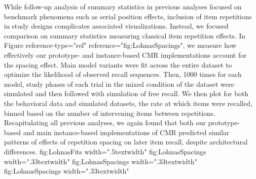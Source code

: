 {}While follow-up analysis of summary statistics in previous analyses focused on benchmark phenomena such as serial position effects, inclusion of item repetitions in study designs complicates associated visualizations. Instead, we focused comparison on summary statistics measuring classical item repetition effects. In Figure \markdownRendererLeftBrace{}reference-type="ref" reference="fig:LohnasSpacings"\markdownRendererRightBrace{}, we measure how effectively our prototype- and instance-based CMR implementations account for the spacing effect. Main model variants were fit across the entire dataset to optimize the likelihood of observed recall sequences. Then, 1000 times for each model, study phases of each trial in the mixed condition of the dataset were simulated and then followed with simulation of free recall. We then plot for both the behavioral data and simulated datasets, the rate at which items were recalled, binned based on the number of intervening items between repetitions. Recapitulating all previous analyses, we again found that both our prototype-based and main instance-based implementations of CMR predicted similar patterns of effects of repetition spacing on later item recall, despite architectural differences.\markdownRendererInterblockSeparator
{}\markdownRendererLeftBrace{}\markdownRendererHash{}fig:LohnasFits width=".5\markdownRendererBackslash{}textwidth"\markdownRendererRightBrace{}\markdownRendererInterblockSeparator
{}\markdownRendererLeftBrace{}\markdownRendererHash{}fig:LohnasSpacings width=".33\markdownRendererBackslash{}textwidth"\markdownRendererRightBrace{} \markdownRendererLeftBrace{}\markdownRendererHash{}fig:LohnasSpacings width=".33\markdownRendererBackslash{}textwidth"\markdownRendererRightBrace{} \markdownRendererLeftBrace{}\markdownRendererHash{}fig:LohnasSpacings width=".33\markdownRendererBackslash{}textwidth"\markdownRendererRightBrace{}\relax